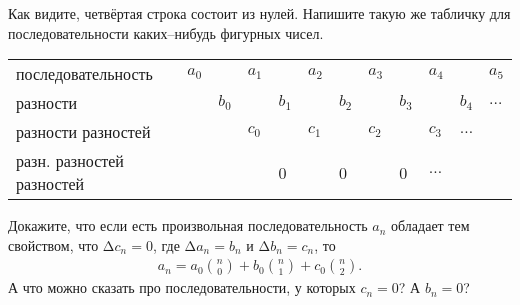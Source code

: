 \begin{itemize}
Как видите, четвёртая строка состоит из нулей. Напишите такую же табличку для последовательности каких--нибудь фигурных чисел. 

\begin{center} \scriptsize \begin{tabular}{llllllllllll}
	\hline
	{\tiny последовательность} & $a_0$ & & $a_1$ & & $a_2$ & & $a_3$
		& & $a_4$ & & $a_5$ \\
	{\tiny разности} & & $b_0$ & & $b_1$ & & $b_2$ & & $b_3$ & & $b_4$ & $\ldots$ \\
	{\tiny разности разностей} & & & $c_0$ & & $c_1$ & & $c_2$ & & $c_3$ & $\ldots$ \\
	{\tiny разн. разностей разностей} & & & & 0 & & 0 & & 0 & $\ldots$ \\
	\hline
\end{tabular} \end{center} \medskip

Докажите, что если есть произвольная последовательность $a_n$ обладает тем свойством, что $\text{Δ} c_n = 0$, где $\text{Δ} a_n = b_n$ и $\text{Δ} b_n = c_n$, то
\begin{align*}
a_n = a_0 \binom{n}{0} + b_0 \binom{n}{1} + c_0 \binom{n}{2}.
\end{align*}
А что можно сказать про последовательности, у которых $c_n = 0$? А $b_n = 0$?
\end{itemize}